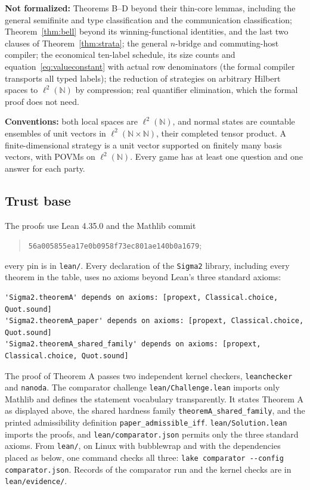 \noindent\textbf{Not formalized:} Theorems B--D beyond their thin-core
lemmas, including the general semifinite and type classification and the
communication classification; Theorem~\ref{thm:bell} beyond its
winning-functional identities, and the last two clauses of
Theorem~\ref{thm:strata}; the general $n$-bridge and commuting-host
compiler; the economical ten-label schedule, its size counts and
equation~\eqref{eq:valueconstant} with actual row denominators (the
formal compiler transports all typed labels); the reduction of strategies
on arbitrary Hilbert spaces to $\ell^2(\mathbb N)$ by compression;
real quantifier elimination, which the formal proof does not need.

\noindent\textbf{Conventions:} both local spaces are $\ell^2(\mathbb N)$,
and normal states are countable ensembles of unit vectors in
$\ell^2(\mathbb N\times\mathbb N)$, their completed tensor product. A
finite-dimensional strategy is a unit vector supported on finitely many
basis vectors, with POVMs on $\ell^2(\mathbb N)$. Every game has at least
one question and one answer for each party.

\subsection{Trust base}
The proofs use Lean 4.35.0 and the Mathlib commit
\begin{quote}\small
\nolinkurl{56a005855ea17e0b0958f73ec801ae140b0a1679};
\end{quote}
every pin is in \nolinkurl{lean/}. Every declaration of the
\texttt{Sigma2} library, including every theorem in the table, uses no
axioms beyond Lean's three standard axioms:
\begingroup\scriptsize
\begin{verbatim}
'Sigma2.theoremA' depends on axioms: [propext, Classical.choice, Quot.sound]
'Sigma2.theoremA_paper' depends on axioms: [propext, Classical.choice, Quot.sound]
'Sigma2.theoremA_shared_family' depends on axioms: [propext, Classical.choice, Quot.sound]
\end{verbatim}\endgroup
The proof of Theorem A passes two independent kernel checkers,
\texttt{leanchecker} and \texttt{nanoda}. The comparator challenge
\nolinkurl{lean/Challenge.lean} imports only Mathlib and defines the
statement vocabulary transparently. It states Theorem A as displayed
above, the shared hardness family \nolinkurl{theoremA_shared_family}, and
the printed admissibility definition \nolinkurl{paper_admissible_iff}.
\nolinkurl{lean/Solution.lean} imports the proofs, and
\nolinkurl{lean/comparator.json} permits only the three standard axioms.
From \texttt{lean/}, on Linux with bubblewrap and with the dependencies
placed as below, one command checks all three:
\texttt{lake comparator -{}-config comparator.json}.
Records of the comparator run and the kernel checks are in
\nolinkurl{lean/evidence/}.

